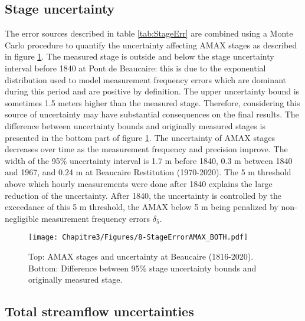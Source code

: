     \subsection{Stage uncertainty}
    \label{subsec:StageErrResults}
    
    The error sources described in table \ref{tab:StageErr} are combined using a Monte Carlo procedure to quantify the uncertainty affecting AMAX stages as described in figure \ref{fig:StageErrAMAX}. The measured stage is outside and below the stage uncertainty interval before 1840 at Pont de Beaucaire: this is due to the exponential distribution used to model measurement frequency errors which are dominant during this period and are positive by definition. The upper uncertainty bound is sometimes 1.5 meters higher than the measured stage. Therefore, considering this source of uncertainty may have substantial consequences on the final results. The difference between uncertainty bounds and originally measured stages is presented in the bottom part of figure \ref{fig:StageErrAMAX}. The uncertainty of AMAX stages decreases over time as the measurement frequency and precision improve. The width of the 95\% uncertainty interval is 1.7 m before 1840, 0.3 m between 1840 and 1967, and 0.24 m at Beaucaire Restitution (1970-2020). The 5 m threshold above which hourly measurements were done after 1840 explains the large reduction of the uncertainty. After 1840, the uncertainty is controlled by the exceedance of this 5 m threshold, the AMAX below 5 m being penalized by non-negligible measurement frequency errors $\delta_5$. 
    
    \begin{figure}[h!]
        \centering
        \texttt{[image: Chapitre3/Figures/8-StageErrorAMAX\_BOTH.pdf]}\hfill
        \caption{Top: AMAX stages and uncertainty at Beaucaire (1816-2020). Bottom: Difference between 95\% stage uncertainty bounds and originally measured stage.}
        \label{fig:StageErrAMAX}
    \end{figure}
  \FloatBarrier

    \subsection{Total streamflow uncertainties}
    

